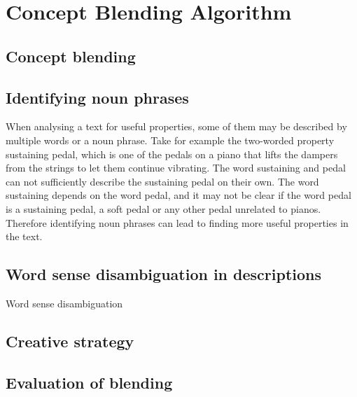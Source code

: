 
\chapter{Concept Blending Algorithm} %

\label{Chapter5} %


\section{Concept blending}


\section{Identifying noun phrases}
When analysing a text for useful properties, some of them may be described by multiple words or a noun phrase. Take for example the two-worded property sustaining pedal, which is one of the pedals on a piano that lifts the dampers from the strings to let them continue vibrating. The word sustaining and pedal can not sufficiently describe the sustaining pedal on their own. The word sustaining depends on the word pedal, and it may not be clear if the word pedal is a sustaining pedal, a soft pedal or any other pedal unrelated to pianos. Therefore identifying noun phrases can lead to finding more useful properties in the text.


\section{Word sense disambiguation in descriptions}
Word sense disambiguation


\section{Creative strategy}


\section{Evaluation of blending}

